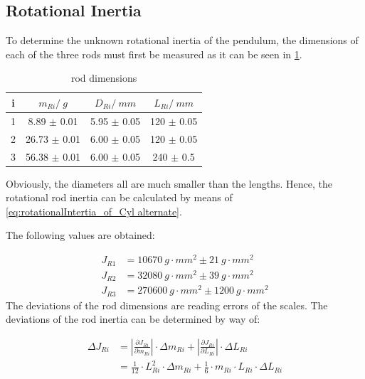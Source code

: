         \subsection{Rotational Inertia}
            To determine the unknown rotational inertia of the pendulum, the dimensions of each of the three rods must first be measured
            as it can be seen in \cref{rod dimensions}.\par
            \begin{table}[H]
                \centering
                \caption{rod dimensions}
                \label{rod dimensions}
                \begin{tabular}{@{}cccc@{}}
                    \toprule
                    i & $ m_{Ri} / \SI{}{g} $   & $ D_{Ri} / \SI{}{mm} $    & $ L_{Ri} / \SI{}{mm} $ \\
                    \midrule
                    1 & 8.89 $\pm$ 0.01         & 5.95 $\pm$ 0.05           & 120 $\pm$ 0.05 \\
                    2 & 26.73 $\pm$ 0.01        & 6.00 $\pm$ 0.05           & 120 $\pm$ 0.05 \\
                    3 & 56.38 $\pm$ 0.01        & 6.00 $\pm$ 0.05           & 240 $\pm$ 0.5 \\
                    \bottomrule
                \end{tabular}
            \end{table}
            Obviously, the diameters all are much smaller than the lengths. Hence, the rotational rod inertia can be calculated
            by means of \cref{eq:rotationalIntertia_of_Cyl alternate}.\par
            The following values are obtained:\par
            \begin{align}
                J_{R1}  &=\SI{10670}{g\cdot mm^2} \pm \SI{21}{g\cdot mm^2}\\
                J_{R2}  &=\SI{32080}{g\cdot mm^2} \pm \SI{39}{g\cdot mm^2}\\
                J_{R3}  &=\SI{270600}{g\cdot mm^2} \pm \SI{1200}{g\cdot mm^2}
            \end{align}
            The deviations of the rod dimensions are reading errors of the scales. The deviations of the rod inertia can be determined by way of:\par
            \begin{align}
                \Delta J_{Ri}   &=\left| \frac{\partial J_{Ri}}{\partial m_{Ri}} \right| \cdot \Delta m_{Ri} + \left| \frac{\partial J_{Ri}}{\partial L_{Ri}} \right| \cdot \Delta L_{Ri} \nonumber\\
                                &=\frac{1}{12}\cdot L_{Ri}^2\cdot \Delta m_{Ri} + \frac{1}{6}\cdot m_{Ri}\cdot L_{Ri}\cdot \Delta L_{Ri}
            \end{align}
